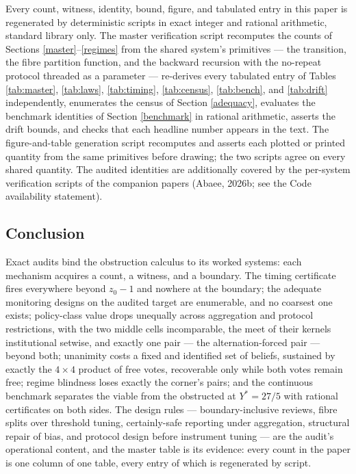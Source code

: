 \documentclass[10pt,twocolumn]{article}
\theoremstyle{definition}
\begin{document}
Every count, witness, identity, bound, figure, and tabulated entry in
this paper is regenerated by deterministic scripts in exact integer and
rational arithmetic, standard library only. The master verification
script recomputes the counts of Sections \ref{master}--\ref{regimes}
from the shared system's primitives --- the transition, the fibre
partition function, and the backward recursion with the no-repeat
protocol threaded as a parameter --- re-derives every tabulated entry of
Tables \ref{tab:master}, \ref{tab:laws}, \ref{tab:timing},
\ref{tab:census}, \ref{tab:bench}, and \ref{tab:drift} independently,
enumerates the census of Section \ref{adequacy}, evaluates the
benchmark identities of Section \ref{benchmark} in rational
arithmetic, asserts the drift bounds, and checks that each headline
number appears in the text. The figure-and-table generation script
recomputes and asserts each plotted or printed quantity from the same
primitives before drawing; the two scripts agree on every shared
quantity. The audited identities are additionally covered by the
per-system verification scripts of the companion papers (Abaee, 2026b;
see the Code availability statement).

\subsection{Conclusion}\label{conclusion}

Exact audits bind the obstruction calculus to its worked systems: each
mechanism acquires a count, a witness, and a boundary. The timing
certificate fires everywhere beyond \(z_0 - 1\) and nowhere at the
boundary; the adequate monitoring designs on the audited target are
enumerable, and no coarsest one exists; policy-class value drops
unequally across aggregation and protocol restrictions, with the two
middle cells incomparable, the meet of their kernels institutional
setwise, and exactly one pair --- the alternation-forced pair --- beyond
both; unanimity costs a fixed and identified set of beliefs, sustained
by exactly the \(4 \times 4\) product of free votes, recoverable only
while both votes remain free; regime blindness loses exactly the
corner's pairs; and the continuous benchmark separates the viable from
the obstructed at \(Y^{*} = 27/5\) with rational certificates on both
sides. The design rules --- boundary-inclusive reviews, fibre splits
over threshold tuning, certainly-safe reporting under aggregation,
structural repair of bias, and protocol design before instrument tuning
--- are the audit's operational content, and the master table is its
evidence: every count in the paper is one column of one table, every
entry of which is regenerated by script.
\end{document}
